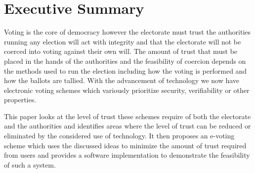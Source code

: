 \newpage
{}
\thispagestyle{plain}

\vspace*{\fill}

\section*{Executive Summary}


Voting is the core of democracy however the electorate must trust the authorities running any election will act with integrity and that the electorate will not be coerced into voting against their own will.
The amount of trust that must be placed in the hands of the authorities and the feasibility of coercion depends on the methods used to run the election including how the voting is performed and how the ballots are tallied.
With the advancement of technology we now have electronic voting schemes which variously prioritize security, verifiability or other properties.

This paper looks at the level of trust these schemes require of both the electorate and the authorities and identifies areas where the level of trust can be reduced or eliminated by the considered use of technology.
It then proposes an e-voting scheme which uses the discussed ideas to minimize the amount of trust required from users and provides a software implementation to demonstrate the feasibility of such a system.

\vspace*{\fill}
